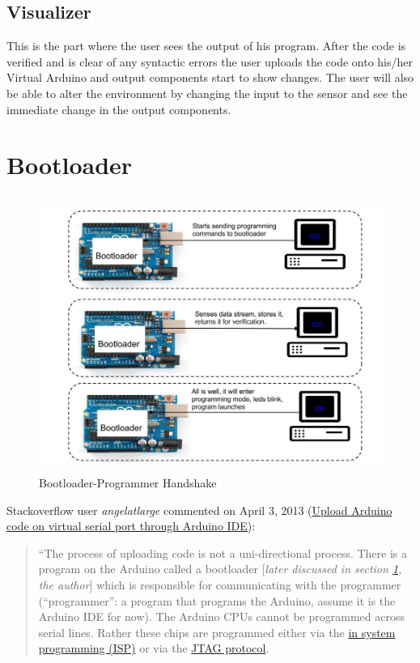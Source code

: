 \subsection{Visualizer}
This is the part where the user sees the output of his program. After the code is verified and is clear of any syntactic errors the user uploads the code onto his/her Virtual Arduino and output components start to show changes. The user will also be able to alter the environment by changing the input to the sensor and see the immediate change in the output components. 

\section{Bootloader}
\label{sec:bootloader}
\begin{figure}[h!]
\centering
\includegraphics[height=9cm, width=12cm]{Bootloader.jpg}
\caption{Bootloader-Programmer Handshake}
\label{Bootloader Handshake}
\end{figure}
Stackoverflow \cite{Stackoverflow:URL} user \emph{angelatlarge} commented on April 3, 2013 (\href{http://stackoverflow.com/questions/15785087/upload-arduino-code-on-virtual-serial-port-through-arduino-ide/15792961?noredirect=1#comment22546153_15792961}{Upload Arduino code on virtual serial port through Arduino IDE}):
\begin{quotation}
``The process of uploading code is not a uni-directional process. There is a program on the Arduino called a bootloader [\emph{later discussed in section \ref{sec:bootloader}, the author}] which is responsible for communicating with the programmer (``programmer'': a program that programs the Arduino, assume it is the Arduino IDE for now). The Arduino CPUs cannot be programmed across serial lines. Rather these chips are programmed either via the \href{http://www.atmel.com/images/doc0943.pdf}{in system programming (ISP)} or via the \href{http://en.wikipedia.org/wiki/Jtag}{JTAG protocol}.
\end{quotation}
